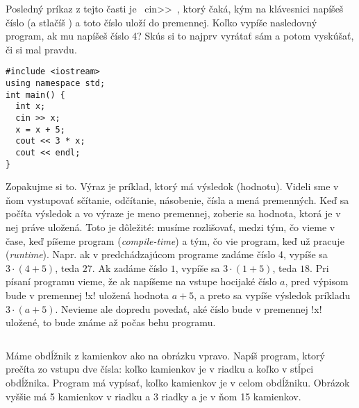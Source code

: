 Posledný príkaz z tejto časti je 
\prg~cin>>~, ktorý čaká, kým na klávesnici napíšeš číslo (a stlačíš )
a toto číslo uloží do premennej. Koľko vypíše nasledovný program,
ak mu napíšeš číslo 4? Skús si to najprv vyrátať sám a potom vyskúšať, či si mal pravdu. 

\begin{lstlisting}
#include <iostream>
using namespace std;
int main() {
  int x;
  cin >> x;
  x = x + 5;
  cout << 3 * x;
  cout << endl;
}
\end{lstlisting}

Zopakujme si to. Výraz je príklad, ktorý má výsledok (hodnotu). Videli sme
v ňom vystupovať sčítanie, odčítanie, násobenie, čísla a mená premenných. 
Keď sa počíta výsledok a vo výraze je meno premennej, zoberie sa hodnota, ktorá je v nej 
práve uložená. Toto je dôležité: musíme rozlišovať, medzi tým, čo vieme v čase, keď píšeme 
program ({\em compile-time}) a tým, čo vie program, keď už pracuje ({\em runtime}).
Napr. ak v predchádzajúcom programe  zadáme číslo 4, vypíše sa $3\cdot(4+5)$, teda $27$.
Ak zadáme číslo $1$, vypíše sa $3\cdot(1+5)$, teda $18$. Pri písaní programu vieme,
že ak napíšeme na vstupe hocijaké číslo $a$, pred výpisom bude v premennej \prg!x! uložená
hodnota $a+5$, a preto sa vypíše  výsledok príkladu $3\cdot(a+5)$.
Nevieme ale dopredu povedať, aké číslo bude v premennej \prg!x! uložené, to bude známe až počas behu programu.

\begin{column}{0.8}
\begin{uloha}
  Máme obdĺžnik z kamienkov ako na obrázku vpravo.
  Napíš program, ktorý prečíta zo vstupu dve čísla: koľko kamienkov je v riadku
  a koľko v stĺpci obdĺžnika. Program má vypísať, koľko kamienkov je v celom obdĺžniku.
  Obrázok vyššie má 5 kamienkov v riadku a 3 riadky a je v ňom  15 kamienkov.
\end{uloha}
\end{column}

